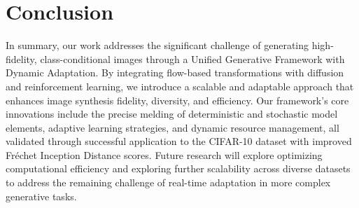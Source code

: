 \section{Conclusion}

In summary, our work addresses the significant challenge of generating high-fidelity, class-conditional images through a Unified Generative Framework with Dynamic Adaptation. By integrating flow-based transformations with diffusion and reinforcement learning, we introduce a scalable and adaptable approach that enhances image synthesis fidelity, diversity, and efficiency. Our framework's core innovations include the precise melding of deterministic and stochastic model elements, adaptive learning strategies, and dynamic resource management, all validated through successful application to the CIFAR-10 dataset with improved Fréchet Inception Distance scores. Future research will explore optimizing computational efficiency and exploring further scalability across diverse datasets to address the remaining challenge of real-time adaptation in more complex generative tasks.


